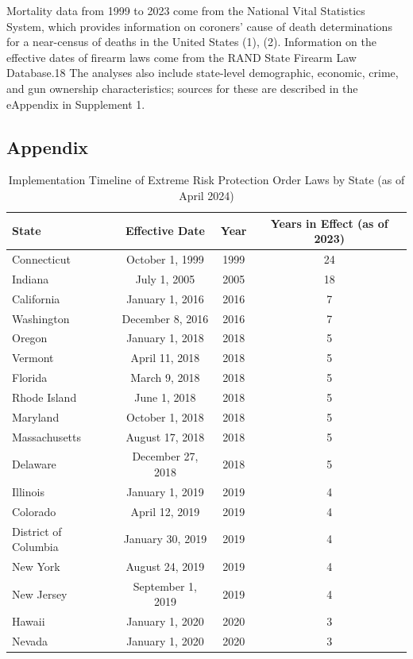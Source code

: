 \documentclass[
  11pt,
]{article}
\begin{document}
Mortality data from 1999 to 2023 come from the National Vital Statistics
System, which provides information on coroners' cause of death
determinations for a near-census of deaths in the United States (1),
(2). Information on the effective dates of firearm laws come from the
RAND State Firearm Law Database.18 The analyses also include state-level
demographic, economic, crime, and gun ownership characteristics; sources
for these are described in the eAppendix in Supplement 1.

\subsection{Appendix}\label{appendix}

\begin{table}[ht]
\centering
\caption{Implementation Timeline of Extreme Risk Protection Order Laws by State (as of April 2024)}
\label{tab:erpo_timeline}
\begin{tabular}{lccc}
\toprule
\textbf{State} & \textbf{Effective Date} & \textbf{Year} & \textbf{Years in Effect (as of 2023)} \\
\midrule
Connecticut & October 1, 1999 & 1999 & 24 \\
Indiana & July 1, 2005 & 2005 & 18 \\
California & January 1, 2016 & 2016 & 7 \\
Washington & December 8, 2016 & 2016 & 7 \\
Oregon & January 1, 2018 & 2018 & 5 \\
Vermont & April 11, 2018 & 2018 & 5 \\
Florida & March 9, 2018 & 2018 & 5 \\
Rhode Island & June 1, 2018 & 2018 & 5 \\
Maryland & October 1, 2018 & 2018 & 5 \\
Massachusetts & August 17, 2018 & 2018 & 5 \\
Delaware & December 27, 2018 & 2018 & 5 \\
Illinois & January 1, 2019 & 2019 & 4 \\
Colorado & April 12, 2019 & 2019 & 4 \\
District of Columbia & January 30, 2019 & 2019 & 4 \\
New York & August 24, 2019 & 2019 & 4 \\
New Jersey & September 1, 2019 & 2019 & 4 \\
Hawaii & January 1, 2020 & 2020 & 3 \\
Nevada & January 1, 2020 & 2020 & 3 \\

\end{tabular}
\end{table}
\end{document}
